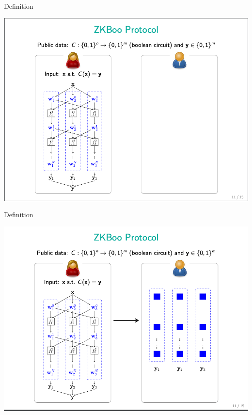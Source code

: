 \documentclass{beamer}
\begin{document}
\begin{frame}{Definition}
	\begin{minipage}{0.42\linewidth}
		\includegraphics[scale=0.4]{f20.png}
	\end{minipage}
\end{frame}


\begin{frame}{Definition}
	\begin{minipage}{0.42\linewidth}
		\includegraphics[scale=0.4]{f21.png}
	\end{minipage}
\end{frame}
\end{document}
